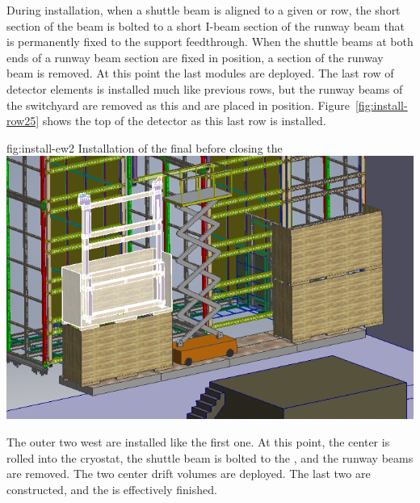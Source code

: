During installation, when a shuttle beam is aligned to a given  or  row, the short section of the beam is bolted to a short I-beam section of the runway beam that is permanently fixed to the  support feedthrough. When the shuttle beams at both ends of a runway beam section are fixed in position, a section of the runway beam is removed. At this point the last  modules are deployed. The last row of detector elements is installed much like previous rows, but the runway beams of the  switchyard are removed as this  and  are placed in position. Figure~\ref{fig:install-row25} shows the top of the detector as this last row is installed. 

\begin{dunefigure}{fig:install-ew2}
  {Installation of the final  before closing the }
\includegraphics[width=.9\textwidth]{graphics/install-ew2.png}
\end{dunefigure}

The outer two west  are installed like the first one. At this point, the center  is rolled into the cryostat, the shuttle beam is bolted to the , and the runway beams are removed. The two center drift volumes  are deployed. The last two  are constructed, and the  is effectively %
finished. 

